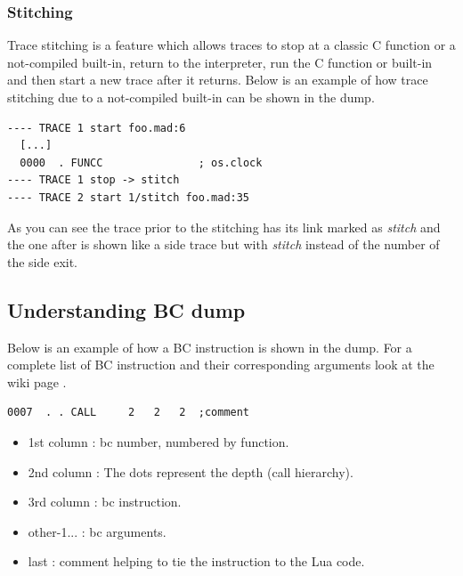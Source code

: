 \subsubsection{Stitching}
Trace stitching is a feature which allows traces to stop at a classic C function
or a not-compiled built-in, return to the interpreter, run the C function or
built-in and then start a new trace after it returns. Below is an example of
how trace stitching due to a not-compiled built-in can be shown in the dump.
\begin{verbatim}
---- TRACE 1 start foo.mad:6
  [...]
  0000  . FUNCC               ; os.clock
---- TRACE 1 stop -> stitch
---- TRACE 2 start 1/stitch foo.mad:35
\end{verbatim}
As you can see the trace prior to the stitching has its link marked as
\emph{stitch} and the one after is shown like a side trace but with
\emph{stitch} instead of the number of the side exit.


\subsection{Understanding BC dump}
\label{Subsec:dump-bc}

Below is an example of how a BC instruction is shown in the dump. For a complete
list of BC instruction and their corresponding arguments look at the wiki page
\cite{luajit-bc}.
\begin{verbatim}
0007  . . CALL     2   2   2  ;comment
\end{verbatim}
\begin{itemize}
  \item 1st column : bc number, numbered by function.
  \item 2nd column : The dots represent the depth (call hierarchy).
  \item 3rd column : bc instruction.
  \item other-1... : bc arguments.
  \item last       : comment helping to tie the instruction to the Lua code.
\end{itemize}



